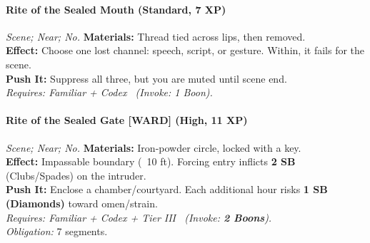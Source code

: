 \paragraph{Rite of the Sealed Mouth (Standard, 7 XP)} \emph{Scene; Near; No.}
\textbf{Materials:} Thread tied across lips, then removed.\\
\textbf{Effect:} Choose one lost channel: speech, script, or gesture. Within, it fails for the scene.\\
\textbf{Push It:} Suppress all three, but you are muted until scene end.\\
\emph{Requires: Familiar + Codex \ (\textit{Invoke:} 1 Boon).}

\paragraph{Rite of the Sealed Gate \textnormal{[WARD]} (High, 11 XP)} \emph{Scene; Near; No.}
\textbf{Materials:} Iron-powder circle, locked with a key.\\
\textbf{Effect:} Impassable boundary (~10 ft). Forcing entry inflicts \textbf{2 SB} (Clubs/Spades) on the intruder.\\
\textbf{Push It:} Enclose a chamber/courtyard. Each additional hour risks \textbf{1 SB (Diamonds)} toward omen/strain.\\
\emph{Requires: Familiar + Codex + Tier III \ (\textit{Invoke:} \textbf{2 Boons}).}\\
\emph{Obligation:} 7 segments.
